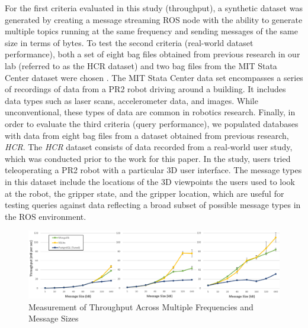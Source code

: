 \documentclass[nocopyrightspace]{acm_proc_article-sp}
\begin{document}
For the first criteria evaluated in this study (throughput), a synthetic dataset was generated by creating a message streaming ROS node with the ability to generate multiple topics running at the same frequency and sending messages of the same size in terms of bytes. To test the second criteria (real-world dataset performance), both a set of eight bag files obtained from previous research in our lab (referred to as the HCR dataset) and two bag files from the MIT Stata Center dataset were chosen \cite{fallon2013stata}. The MIT Stata Center data set encompasses a series of recordings of data from a PR2 robot driving around a building. It includes data types such as laser scans, accelerometer data, and images. While unconventional, these types of data are common in robotics research. Finally, in order to evaluate the third criteria (query performance), we populated databases with data from eight bag files from a dataset obtained from previous research, \textit{HCR}. The \textit{HCR} dataset consists of data recorded from a real-world user study, which was conducted prior to the work for this paper. In the study, users tried teleoperating a PR2 robot with a particular 3D user interface. The message types in this dataset include the locations of the 3D viewpoints the users used to look at the robot, the gripper state, and the gripper location, which are useful for testing queries against data reflecting a broad subset of possible message types in the ROS environment.

\begin{figure}
    \centering
    \includegraphics[width=\linewidth]{images/throughput}
    \caption{Measurement of Throughput Across Multiple Frequencies and Message Sizes}
    \label{fig:throughput}
\end{figure}
\end{document}
